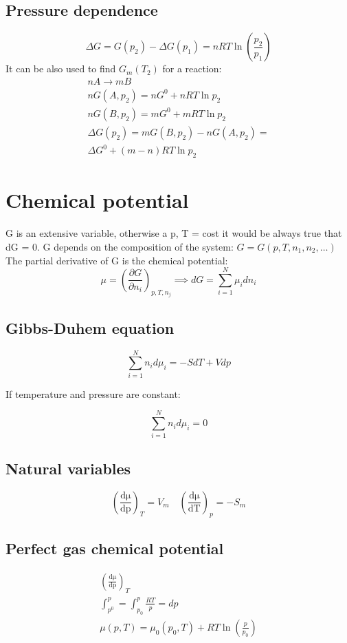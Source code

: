 \documentclass[Master.tex]{subfiles}
\begin{document}
\begin{multicols}{2}
		  \subsection{Pressure dependence}
				   \[
						    \Delta G = G(p_2) - \Delta G(p_1) = nRT\ln \left( \frac{p_2}{p_1} \right)
				   \]
				   It can be also used to find \( G_{m}(T_2) \) for a reaction:
				   \begin{gather*}
						    nA \to mB \\
						    nG(A,p_2) = nG^{0} + nRT\ln p_2 \\
						    nG(B,p_2) = mG^{0} + mRT \ln p_2 \\
						    \Delta G(p_2) = mG(B,p_2) - nG(A,p_2) =\\
						    \Delta G^{0} + (m-n)RT\ln p_2
				   \end{gather*}

		 \section{Chemical potential}
		  G is an extensive variable, otherwise a p, T = cost it would be always true
		  that dG = 0. G depends on the composition of the system: \( G = G(p, T, n_{1},
		  n_{2}, \ldots ) \) The partial derivative of G is the chemical potential:
		  \[
		  \mu = \left( \frac{\partial G}{\partial n_{i} } \right) _{p, T, n_{j}} \implies dG = \sum_{i=1}^{N} \mu _{i}dn_{i}
				  \]

				  \subsection{Gibbs-Duhem equation}
						   \[
								    \sum_{i=1}^{N} n_{i}d\mu _{i}= -SdT + Vdp
						   \]

						   If temperature and pressure are constant:

						   \[
								    \sum_{i=1}^{N} n_{i}d\mu _{i} = 0
						   \]
				  \subsection{Natural variables}
						   \[
								    \left( \frac{\mathrm{d\mu }}{\mathrm{dp}}   \right)_{T} = V_{m}  \quad \left( \frac{\mathrm{d\mu }}{\mathrm{dT}}  \right) _{p} = -S_{m}
						   \]
				  \subsection{Perfect gas chemical potential}
						   \begin{gather*}
								    \left( \frac{\mathrm{d\mu }}{\mathrm{dp}}  \right) _{T}\\
								    \int_{p^{0} }^{p} = \int_{p_{0} }^{p} \frac{RT}{p} = dp\\
								    \mu (p,T) = \mu _{0}(p_{0},T ) + RT\ln \left( \frac{p}{p_{0} } \right)
						   \end{gather*}

\end{multicols}
\end{document}
